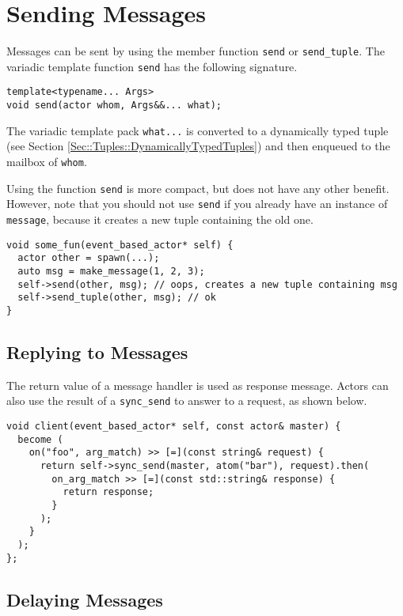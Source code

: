 \section{Sending Messages}
\label{Sec::Send}

Messages can be sent by using the member function \lstinline^send^ or \lstinline^send_tuple^.
The variadic template function \lstinline^send^ has the following signature.

\begin{lstlisting}
template<typename... Args>
void send(actor whom, Args&&... what);
\end{lstlisting}

The variadic template pack \lstinline^what...^ is converted to a dynamically typed tuple (see Section \ref{Sec::Tuples::DynamicallyTypedTuples}) and then enqueued to the mailbox of \lstinline^whom^.

Using the function \lstinline^send^ is more compact, but does not have any other benefit.
However, note that you should not use \lstinline^send^ if you already have an instance of \lstinline^message^, because it creates a new tuple containing the old one.

\begin{lstlisting}
void some_fun(event_based_actor* self) {
  actor other = spawn(...);
  auto msg = make_message(1, 2, 3);
  self->send(other, msg); // oops, creates a new tuple containing msg
  self->send_tuple(other, msg); // ok
}
\end{lstlisting}

\clearpage
\subsection{Replying to Messages}
\label{Sec::Send::Reply}

The return value of a message handler is used as response message.
Actors can also use the result of a \lstinline^sync_send^ to answer to a request, as shown below.

\begin{lstlisting}
void client(event_based_actor* self, const actor& master) {
  become (
    on("foo", arg_match) >> [=](const string& request) {
      return self->sync_send(master, atom("bar"), request).then(
        on_arg_match >> [=](const std::string& response) {
          return response;
        }
      );
    }
  );
};
\end{lstlisting}

\subsection{Delaying Messages}

